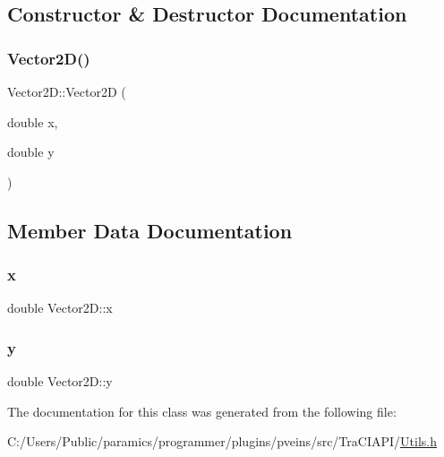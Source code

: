 \subsection{Constructor \& Destructor Documentation}
\mbox{\label{class_vector2_d_a525e125aac4c844f04c52ddb0e75d594}} 
\subsubsection{\texorpdfstring{Vector2\+D()}{Vector2D()}}
{\footnotesize\ttfamily Vector2\+D\+::\+Vector2D (\begin{DoxyParamCaption}\item[{double}]{x,  }\item[{double}]{y }\end{DoxyParamCaption})\hspace{0.3cm}{\ttfamily [inline]}}



\subsection{Member Data Documentation}
\mbox{\label{class_vector2_d_ac5c4e553815737aa24bec8281270178f}} 
\subsubsection{\texorpdfstring{x}{x}}
{\footnotesize\ttfamily double Vector2\+D\+::x}

\mbox{\label{class_vector2_d_ac38d0179cfe74c30fee290a703ab209a}} 
\subsubsection{\texorpdfstring{y}{y}}
{\footnotesize\ttfamily double Vector2\+D\+::y}



The documentation for this class was generated from the following file\+:\begin{DoxyCompactItemize}
\item 
C\+:/\+Users/\+Public/paramics/programmer/plugins/pveins/src/\+Tra\+C\+I\+A\+P\+I/\hyperlink{_utils_8h}{Utils.\+h}\end{DoxyCompactItemize}
